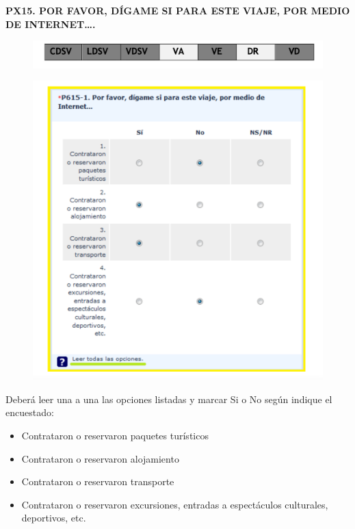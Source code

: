 \documentclass[
  openany]{book}
\begin{document}
\textbf{PX15. POR FAVOR, DÍGAME SI PARA ESTE VIAJE, POR MEDIO DE INTERNET\ldots.}

\begin{figure}

{\centering \includegraphics[width=1\linewidth]{imagenes/figura6-107} 

}

\end{figure}

\begin{figure}

{\centering \includegraphics[width=1\linewidth]{imagenes/figura6-108} 

}

\end{figure}

Deberá leer una a una las opciones listadas y marcar Si o No según indique el encuestado:

\begin{itemize}
\item
  Contrataron o reservaron paquetes turísticos
\item
  Contrataron o reservaron alojamiento
\item
  Contrataron o reservaron transporte
\item
  Contrataron o reservaron excursiones, entradas a espectáculos culturales, deportivos, etc.
\end{itemize}
\end{document}
